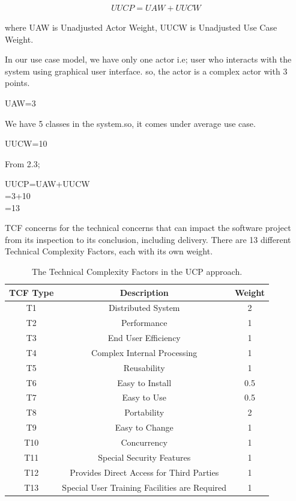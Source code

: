 \documentclass[12pt,letterpaper]{report}
\begin{document}
\begin{align} \label{Use Case Points}
    UUCP=UAW+UUCW
\end{align}

where UAW is Unadjusted Actor Weight, UUCW is Unadjusted Use Case Weight.

In our use case model, we have only one actor i.e; user who interacts with the system using graphical user interface. so, the actor is a complex actor with 3 points.
\begin{center}
    UAW=3
\end{center}

We have 5 classes in the system.so, it comes under average use case.
\begin{center}
    UUCW=10
\end{center}

From 2.3;
\begin{center}
    UUCP=UAW+UUCW\\
        =3+10\\
        =13\\
\end{center}


TCF concerns for the technical concerns that can impact the software project from its inspection to its conclusion, including delivery.
There are 13 different Technical Complexity Factors, each with its 
own weight.

\begin{table}[h]
    \begin{center}
    \begin{tabular}{|c|c|c|}
    \hline
          TCF Type & Description & Weight \\
    \hline\hline
    T1 & Distributed System & 2  \\
    T2 & Performance & 1 \\
    T3 & End User Efficiency & 1 \\
    T4 & Complex Internal Processing  & 1 \\
    T5 & Reusability & 1\\
    T6 & Easy to Install & 0.5 \\
    T7 & Easy to Use & 0.5\\
    T8 & Portability & 2\\
    T9 & Easy to Change & 1\\
    T10 & Concurrency & 1\\
    T11 & Special Security Features & 1\\
    T12 & Provides Direct Access for Third Parties & 1\\
    T13 & Special User Training Facilities are Required & 1\\
    \hline
    \end{tabular}
    \end{center}
    \caption{ The Technical Complexity Factors in the UCP approach.\label{example_table}}
 \end{table}
\end{document}
